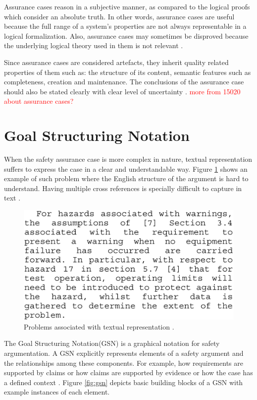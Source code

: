 Assurance cases reason in a subjective manner, as compared to the logical proofs which consider an absolute truth. In other words, assurance cases are useful because the full range of a system's properties are not always representable in a logical formalization. Also, assurance cases may sometimes be disproved because the underlying logical theory used in them is not relevant \cite{iso15026-1-2019}.

Since assurance cases are considered artefacts, they inherit quality related properties of them such as: the structure of its content, semantic features such as completeness, creation and maintenance. The conclusions of the assurance case should also be stated clearly with clear level of uncertainty \cite{iso15026-1-2019}. \textcolor{red}{more from 15020 about assurance cases?}

\section{Goal Structuring Notation}
When the safety assurance case is more complex in nature, textual representation suffers to express the case in a clear and understandable way. Figure \ref{fig:text-case} shows an example of such problem where the English structure of the argument is hard to understand. Having multiple cross references is specially difficult to capture in text \cite{gsn2004Kelly}.
\begin{figure}
    \includegraphics[width=0.5\linewidth ]{figures/textual_case.png}
    \centering
    \caption{Problems associated with textual representation \cite{gsn2004Kelly}.}
    \label{fig:text-case}
\end{figure}

The Goal Structuring Notation(GSN) is a graphical notation for safety argumentation. A GSN explicitly represents elements of a safety argument and the relationships among these components. For example, how requirements are supported by claims or how claims are supported by evidence or how the case has a defined context \cite{gsn2004Kelly}. Figure \ref{fig:gsn} depicts basic building blocks of a GSN with example instances of each element. 

